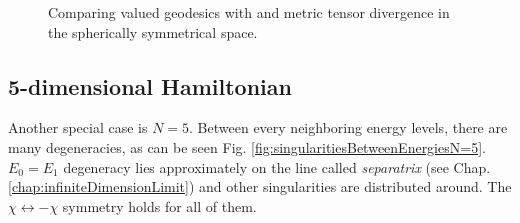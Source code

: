 \begin{figure}[H]
    \centering
    \caption{Comparing  valued geodesics with  and  metric tensor divergence in the spherically symmetrical space. }
    \label{fig:geodesicsinGR}
\end{figure}








\subsection{5-dimensional Hamiltonian}

Another special case is $N=5$. Between every neighboring energy levels, there are many degeneracies, as can be seen Fig. \ref{fig:singularitiesBetweenEnergiesN=5}. $E_0=E_1$ degeneracy lies approximately on the line called \emph{separatrix} (see Chap. \ref{chap:infiniteDimensionLimit}) and other singularities are distributed around. The $\chi\leftrightarrow-\chi$ symmetry holds for all of them.


